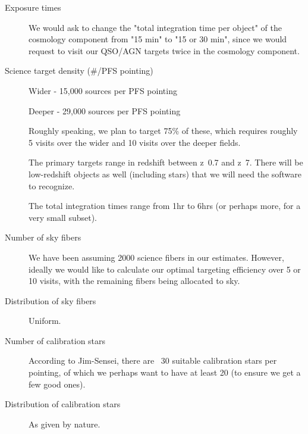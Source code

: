 \documentclass[a4paper,notitlepage]{article}
\begin{document}
\begin{description}

\item[Exposure times]

We would ask to change the "total integration time per object"
of the cosmology component from "15 min" to "15 or 30 min",
since we would request to visit our QSO/AGN targets twice in
the cosmology component.

\item[Science target density (\#/PFS pointing)]

Wider - 15,000 sources per PFS pointing

Deeper - 29,000 sources per PFS pointing

Roughly speaking, we plan to target 75\% of these, which requires 
roughly 5 visits over the wider and 10 visits over the deeper fields.

The primary targets range in redshift between z~0.7 and z~7.  There will 
be low-redshift objects as well (including stars) that we will need the 
software to recognize. 

The total integration times range from 1hr to 6hrs (or 
perhaps more, for a very small subset).

\item[Number of sky fibers]

We have been assuming 2000 science fibers 
in our estimates.  However, ideally we would like to calculate our 
optimal targeting efficiency over 5 or 10 visits, with the remaining 
fibers being allocated to sky.

\item[Distribution of sky fibers] Uniform.

\item[Number of calibration stars]
According to Jim-Sensei, there are 
~30 suitable calibration stars per pointing, of which we perhaps 
want to have at least 20 (to ensure we get a few good ones).

\item[Distribution of calibration stars]
As given by nature.

\end{description}



\renewcommand{\thesubsection}{Q.2.1-\alph{subsection}}
\setcounter{subsection}{0}
\end{document}

